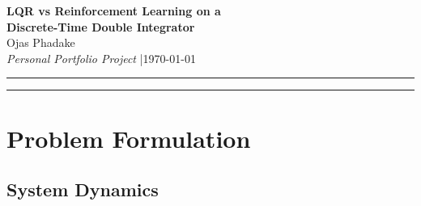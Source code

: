 \documentclass[11pt, a4paper]{article}
\newcommand{\T}{^\top}
\begin{document}
\begin{center}
  {\LARGE \textbf{LQR vs Reinforcement Learning on a}}\\[4pt]
  {\LARGE \textbf{Discrete-Time Double Integrator}}\\[12pt]
  {\large Ojas Phadake}\\[4pt]
  {\normalsize \textit{Personal Portfolio Project} \quad|\quad \today}
\end{center}

\vspace{4pt}
\hrule
\vspace{14pt}

\begin{abstract}
We compare Linear Quadratic Regulation (LQR) and Proximal Policy
Optimisation (PPO) on a discrete-time double integrator, a canonical
second-order system in classical control theory. LQR solves the
infinite-horizon quadratic cost problem analytically by computing the
solution to the Discrete Algebraic Riccati Equation (DARE), yielding an
optimal linear feedback law $u_k = -Kx_k$. PPO, a model-free
reinforcement learning algorithm, is given only the reward signal $r_k =
-(x_k\T Q x_k + u_k\T R u_k)$ and no knowledge of the system dynamics.
After $10^5$ environment interactions, PPO achieves a total cost of
$365.05$, compared to the LQR cost of $364.09$ — a suboptimality gap of
$+0.26\%$. The PPO control signal correlates with the LQR signal at $r =
0.987$, indicating that the learned policy closely approximates the linear
feedback law $u \approx -Kx$ without ever observing the system matrices
$A$ or $B$. This result illustrates the deepest connection between optimal
control and reinforcement learning: both are solving the same Bellman
equation, using different information.
\end{abstract}

\vspace{8pt}
\hrule
\vspace{12pt}

\section{Problem Formulation}

\subsection{System Dynamics}
\end{document}

